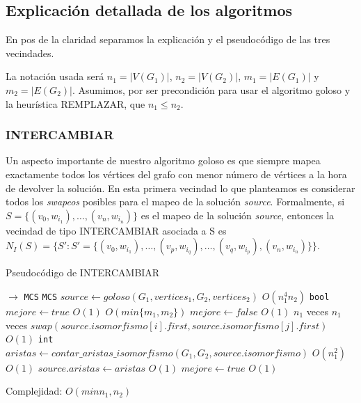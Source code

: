 \subsection{Explicación detallada de los algoritmos}
En pos de la claridad separamos la explicación y el pseudocódigo de las tres vecindades. 

La notación usada será $n_1 = |V(G_1)|$, $n_2 = |V(G_2)|$, $m_1 = |E(G_1)|$ y $m_2 = |E(G_2)|$. Asumimos, por ser precondición para usar el algoritmo goloso y la heurística REMPLAZAR, que $n_1 \leq n_2$. 

\subsubsection{INTERCAMBIAR}
Un aspecto importante de nuestro algoritmo goloso es que siempre mapea exactamente todos los vértices del grafo con menor número de vértices a la hora de devolver la solución. En esta primera vecindad lo que planteamos es considerar todos los \emph{swapeos} posibles para el mapeo de la solución \emph{source}. Formalmente, si $S = \{(v_0, w_{i_1}),\hdots , (v_n, w_{i_n})\}$ es el mapeo de la solución \emph{source}, entonces la vecindad de tipo INTERCAMBIAR asociada a S es $N_I(S) = \{S' : S' = \{(v_0, w_{i_1}),\hdots , (v_p, w_{i_q}) , \hdots, (v_q, w_{i_p}), (v_n, w_{i_n})\}\}$.

\begin{algorithm}[H]
  \small
  \begin{algorithmic}[1]
  \caption{Pseudocódigo de INTERCAMBIAR}
  \label{algo:5-1}
    $\rightarrow$ \texttt{MCS}
      \State \texttt{MCS} $source \gets goloso(G_1, vertices_1, G_2, vertices_2)$
      \Comment $O(n_1^4n_2)$
      \State \texttt{bool} $mejore \gets true$
      \Comment $O(1)$
      \Comment $O(min\{m_1, m_2\})$
        \State $mejore \gets false$
        \Comment $O(1)$
        \Comment $n_1$ veces
          \Comment $n_1$ veces
            \State $swap(source.isomorfismo[i].first, source.isomorfismo[j].first)$
            \Comment $O(1)$
            \State \texttt{int} $aristas \gets contar\_aristas\_isomorfismo(G_1, G_2, source.isomorfismo)$
            \Comment $O(n_1^2)$
            \Comment $O(1)$
              \State $source.aristas \gets aristas$ 
              \Comment $O(1)$             
              \State $mejore \gets true$
              \Comment $O(1)$
            \EndIf
          \EndFor
        \EndFor
      \EndWhile
    \EndProcedure
  \end{algorithmic}
  Complejidad: $O(min{n_1, n_2})$
\end{algorithm}

